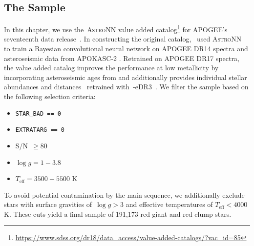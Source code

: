 \subsection{The Sample}
\label{outflows:sec:empirical:apogee}
In this chapter, we use the~\textsc{AstroNN} value added catalog\footnote{
	\url{https://www.sdss.org/dr18/data_access/value-added-catalogs/?vac_id=85}
} for APOGEE's seventeenth data release~\citep[DR17;][]{Abdurrouf2022}.
In constructing the original catalog,~\citet{Mackereth2019b} used
\textsc{AstroNN}~\citep{Leung2019a} to train a Bayesian convolutional neural
network on APOGEE DR14 spectra and asteroseismic data from APOKASC-2
\citep{Pinsonneault2018}.
Retrained on APOGEE DR17 spectra, the value added catalog improves the
performance at low metallicity by incorporating asteroseismic ages from
\citet{Montalban2021} and additionally provides individual stellar abundances
\citep{Leung2019a} and distances~\citep{Leung2019b} retrained
with~\gaia-eDR3~\citep{GaiaCollaboration2021}.
We filter the sample based on the following selection criteria:
\begin{itemize}

	\item \texttt{STAR\_BAD == 0}

	\item \texttt{EXTRATARG == 0}

	\item S/N~$\geq 80$

	\item $\log g = 1 - 3.8$

	\item $T_\text{eff} = 3500 - 5500$ K

\end{itemize}
To avoid potential contamination by the main sequence, we additionally exclude
stars with surface gravities of~$\log g > 3$ and effective temperatures of
$T_\text{eff} < 4000$ K.
These cuts yield a final sample of 191,173 red giant and red clump stars.

